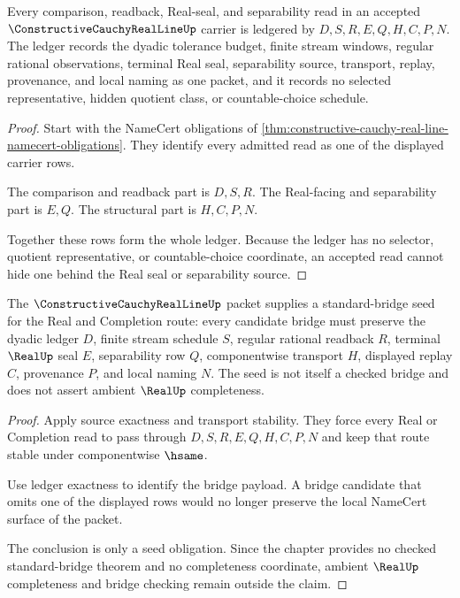 \begin{theorem}
\label{thm:constructive-cauchy-real-line-ledger-exactness}
Every comparison, readback, Real-seal, and separability read in an accepted $\ConstructiveCauchyRealLineUp$ carrier is ledgered by $D,S,R,E,Q,H,C,P,N$. The ledger records the dyadic tolerance budget, finite stream windows, regular rational observations, terminal Real seal, separability source, transport, replay, provenance, and local naming as one packet, and it records no selected representative, hidden quotient class, or countable-choice schedule.
\end{theorem}
\begin{proof}
Start with the NameCert obligations of \autoref{thm:constructive-cauchy-real-line-namecert-obligations}. They identify every admitted read as one of the displayed carrier rows.

The comparison and readback part is $D,S,R$. The Real-facing and separability part is $E,Q$. The structural part is $H,C,P,N$.

Together these rows form the whole ledger. Because the ledger has no selector, quotient representative, or countable-choice coordinate, an accepted read cannot hide one behind the Real seal or separability source.
\end{proof}

\begin{theorem}
\label{thm:constructive-cauchy-real-line-standard-bridge-seed}
The $\ConstructiveCauchyRealLineUp$ packet supplies a standard-bridge seed for the Real and Completion route: every candidate bridge must preserve the dyadic ledger $D$, finite stream schedule $S$, regular rational readback $R$, terminal $\RealUp$ seal $E$, separability row $Q$, componentwise transport $H$, displayed replay $C$, provenance $P$, and local naming $N$. The seed is not itself a checked bridge and does not assert ambient $\RealUp$ completeness.
\end{theorem}
\begin{proof}
Apply source exactness and transport stability. They force every Real or Completion read to pass through $D,S,R,E,Q,H,C,P,N$ and keep that route stable under componentwise $\hsame$.

Use ledger exactness to identify the bridge payload. A bridge candidate that omits one of the displayed rows would no longer preserve the local NameCert surface of the packet.

The conclusion is only a seed obligation. Since the chapter provides no checked standard-bridge theorem and no completeness coordinate, ambient $\RealUp$ completeness and bridge checking remain outside the claim.
\end{proof}

